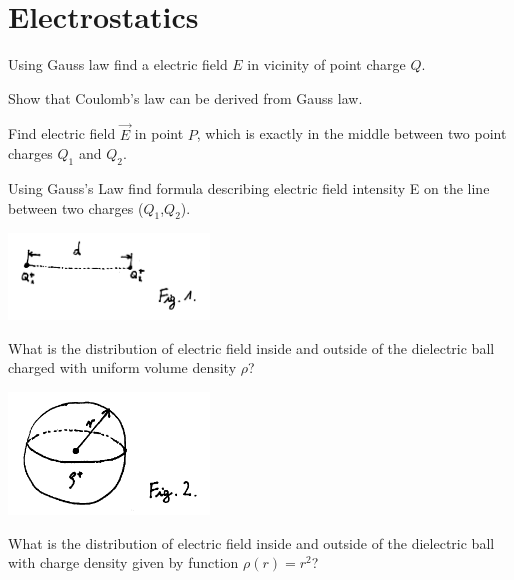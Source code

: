 \section{Electrostatics}


\begin{Exercise}[difficulty=1]
Using Gauss law find a electric field $E$ in vicinity of point charge $Q$.
\end{Exercise}

\begin{Exercise}[difficulty=2]
Show that Coulomb's law can be derived from Gauss law.
\end{Exercise}

\begin{Exercise}[difficulty=2]
Find electric field $\vec{E}$ in point $P$, which is exactly in the middle between two point charges $Q_1$ and $Q_2$. 
\end{Exercise}

\begin{Exercise}[difficulty=3]
Using Gauss's Law find formula describing electric field intensity E on the line between two charges ($Q_1$,$Q_2$). 
\begin{center}
\includegraphics[width=0.4\textwidth]{img/fig_e1.png} 
\end{center}
\end{Exercise}

\begin{Exercise}[difficulty=3]
What is the distribution of electric field inside and outside of the dielectric ball charged with uniform volume density $\rho$?
\begin{center}
\includegraphics[width=0.4\textwidth]{img/fig_e2.png} 
\end{center}
\end{Exercise}

\begin{Exercise}[difficulty=4]
What is the distribution of electric field inside and outside of the dielectric ball with charge density given by function $\rho(r)= r^2$?
\end{Exercise}


